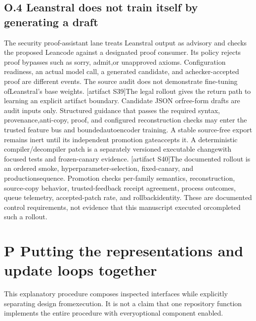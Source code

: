 \subsection*{O.4  Leanstral does not train itself by generating a draft}
\noindent
The security proof-assistant lane treats Leanstral output as advisory and checks the proposed Lean\linebreak[4]
code against a designated proof consumer. Its policy rejects proof bypasses such as sorry, admit,\linebreak[4]
or unapproved axioms. Configuration readiness, an actual model call, a generated candidate, and a\linebreak[4]
checker-accepted proof are different events. The source audit does not demonstrate fine-tuning of\linebreak[4]
Leanstral's base weights. [artifact S39]\linebreak[4]
The legal rollout gives the return path to learning an explicit artifact boundary. Candidate JSON or\linebreak[4]
free-form drafts are audit inputs only. Structured guidance that passes the required syntax, provenance,\linebreak[4]
anti-copy, proof, and configured reconstruction checks may enter the trusted feature bus and bounded\linebreak[4]
autoencoder training. A stable source-free export remains inert until its independent promotion gate\linebreak[4]
accepts it. A deterministic compiler/decompiler patch is a separately versioned executable change\linebreak[4]
with focused tests and frozen-canary evidence. [artifact S40]\linebreak[4]
The documented rollout is an ordered smoke, hyperparameter-selection, fixed-canary, and production\linebreak[4]
sequence. Promotion checks per-family semantics, reconstruction, source-copy behavior, trusted-\linebreak[4]
feedback receipt agreement, process outcomes, queue telemetry, accepted-patch rate, and rollback\linebreak[4]
identity. These are documented control requirements, not evidence that this manuscript executed or\linebreak[4]
completed such a rollout.\par

\section*{P  Putting the representations and update loops together}
\noindent
This explanatory procedure composes inspected interfaces while explicitly separating design from\linebreak[4]
execution. It is not a claim that one repository function implements the entire procedure with every\linebreak[4]
optional component enabled.\par

